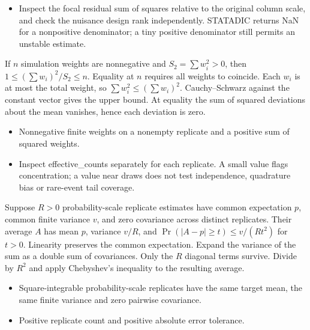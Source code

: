 \expandafter\def\csname statadic@diagnostics@STATADIC-FWL-001\endcsname{\begin{itemize}
\item Inspect the focal residual sum of squares relative to the original column scale, and check the nuisance design rank independently. STATADIC returns NaN for a nonpositive denominator; a tiny positive denominator still permits an unstable estimate.
\end{itemize}}
\expandafter\def\csname statadic@statement@STATADIC-INTEGRATION-001\endcsname{If $n$ simulation weights are nonnegative and
  $S_2=\sum w_i^2>0$, then $1\le (\sum w_i)^2/S_2\le n$.
  Equality at $n$ requires all weights to coincide.}
\expandafter\def\csname statadic@proof@STATADIC-INTEGRATION-001\endcsname{Each $w_i$ is at most the total weight, so
  $\sum w_i^2\le(\sum w_i)^2$. Cauchy--Schwarz against the constant vector
  gives the upper bound. At equality the sum of squared deviations about
  the mean vanishes, hence each deviation is zero.}
\expandafter\def\csname statadic@assumptions@STATADIC-INTEGRATION-001\endcsname{\begin{itemize}
\item Nonnegative finite weights on a nonempty replicate and a positive sum of squared weights.
\end{itemize}}
\expandafter\def\csname statadic@diagnostics@STATADIC-INTEGRATION-001\endcsname{\begin{itemize}
\item Inspect effective\_counts separately for each replicate. A small value flags concentration; a value near draws does not test independence, quadrature bias or rare-event tail coverage.
\end{itemize}}
\expandafter\def\csname statadic@statement@STATADIC-INTEGRATION-002\endcsname{Suppose $R>0$ probability-scale replicate estimates have common
  expectation $p$, common finite variance $v$, and zero covariance across
  distinct replicates. Their average $A$ has mean $p$, variance $v/R$, and
  $\Pr(|A-p|\ge t)\le v/(Rt^2)$ for $t>0$.}
\expandafter\def\csname statadic@proof@STATADIC-INTEGRATION-002\endcsname{Linearity preserves the common expectation. Expand the variance
  of the sum as a double sum of covariances. Only the $R$ diagonal terms survive.
  Divide by $R^2$ and apply Chebyshev's inequality to the resulting average.}
\expandafter\def\csname statadic@assumptions@STATADIC-INTEGRATION-002\endcsname{\begin{itemize}
\item Square-integrable probability-scale replicates have the same target mean, the same finite variance and zero pairwise covariance.
\item Positive replicate count and positive absolute error tolerance.
\end{itemize}}
